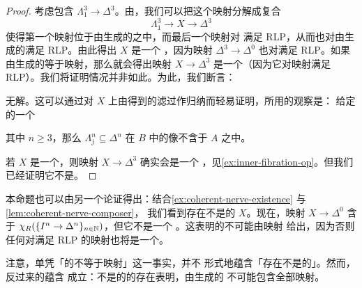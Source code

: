 \begin{proof}
考虑包含 $\Lambda^3_1 \to \Delta^3$。由\trSmallObjectArgument{}，我们可以把这个映射分解成复合
\[
\Lambda^3_1 \to X \to \Delta^3
\]
使得第一个映射位于由\trSpineInclusion{}生成的\trSaturatedClass{}之中，而最后一个映射对\trSpineInclusion{}%
满足 RLP，从而也对由\trSpineInclusion{}生成的\trSaturatedSet{}满足 RLP。由此得出 $X$ 是一个%
\trComposer{}，因为映射 $\Delta^3 \to \Delta^0$ 也对\trSpineInclusion{}满足 RLP。如果
由\trSpineInclusion{}生成的\trSaturatedSet{}等于\trInnerAnodyne{}映射，那么就会得出映射
$X \to \Delta^3$ 是一个\trInnerFibration{}（因为它对\trInnerAnodyne{}映射满足
RLP）。我们将证明情况并非如此。为此，我们断言：\trLiftingProblem{}%
\begin{center}
\end{center}
无解。这可以通过对 $X$ 上由\trSmallObjectArgument{}得到的滤过作归纳而轻易证明，所用的观察是：
给定\trSimplicialSet{}的一个\trPushout{}%
\begin{center}
\end{center}
其中 $n \ge 3$，那么 $\Lambda^n_j \subseteq \Delta^n$ 在 $B$ 中的像不含于 $A$
之中。

若 $X$ 是一个\trInfinityCategory{}，则映射 $X \to \Delta^3$ 确实会是一个%
\trInnerFibration{}，见\cref{ex:inner-fibration-op}。但我们已经证明它不是。
\end{proof}

\begin{remark}\label{rem:alternative-composer-argument}
本命题也可以由另一个论证得出：结合\cref{ex:coherent-nerve-existence} 与\cref{lem:coherent-nerve-composer}，
我们看到存在不是\trInfinityCategory{}的\trComposer{} $X$。现在，映射
$X \to \Delta^0$ 含于 $\chi_R(\{I^n \to \Delta^n\}_{n \in \mathbb{N}})$，但它不是一个%
\trInnerFibration{}。这表明\trSpineInclusion{}的\trSaturation{}不可能由\trInnerAnodyne{}映射
给出，因为否则任何对\trSpineInclusion{}满足 RLP 的映射也将是一个\trInnerFibration{}。

注意，单凭「\trSpineInclusion{}的\trSaturation{}不等于\trInnerAnodyne{}映射」这一事实，并不
形式地蕴含「存在不是\trInfinityCategory{}的\trComposer{}」。然而，反过来的蕴含
成立：不是\trInfinityCategory{}的\trComposer{}的存在表明，由\trSpineInclusion{}生成的%
\trSaturatedSet{}不可能包含全部\trInnerAnodyne{}映射。
\end{remark}

